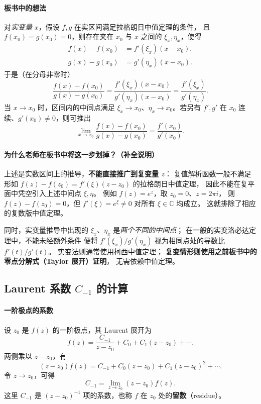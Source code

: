 \paragraph{板书中的想法}
对\emph{实变量} $x$，假设 $f,g$ 在实区间满足拉格朗日中值定理的条件，
且 $f(x_0)=g(x_0)=0$，则存在夹在 $x_0$ 与 $x$ 之间的
$\xi_x,\eta_x$，使得
\begin{align*}
  f(x)-f(x_0)&=f'(\xi_x)(x-x_0),\\
  g(x)-g(x_0)&=g'(\eta_x)(x-x_0).
\end{align*}
于是（在分母非零时）
\[
  \frac{f(x)-f(x_0)}{g(x)-g(x_0)}
  =\frac{f'(\xi_x)(x-x_0)}
         {g'(\eta_x)(x-x_0)}
  =\frac{f'(\xi_x)}{g'(\eta_x)}.
\]
当 $x\to x_0$ 时，区间内的中间点满足
$\xi_x\to x_0$、$\eta_x\to x_0$。若另有
$f',g'$ 在 $x_0$ 连续、$g'(x_0)\ne0$，则可推出
\[
  \lim_{x\to x_0}
    \frac{f(x)-f(x_0)}{g(x)-g(x_0)}
  =\frac{f'(x_0)}{g'(x_0)}.
\]

\paragraph{为什么老师在板书中将这一步划掉？（补全说明）}
上述是实数区间上的推导，\textbf{不能直接推广到复变量 $z$}：
复值解析函数一般不满足形如
$f(z)-f(z_0)=f'(\xi)(z-z_0)$ 的拉格朗日中值定理，
因此不能在复平面中凭空引入上述中间点 $\xi,\eta$。
例如 $f(z)=e^z$，取 $z_0=0$、$z=2\pi i$，
则 $f(z)-f(z_0)=0$，但 $f'(\xi)=e^\xi\ne0$
对所有 $\xi\in\mathbb C$ 均成立。
这就排除了相应的复数版中值定理。

同时，实变量推导中出现的 $\xi_x$、$\eta_x$
是\emph{两个不同的中间点}；
在一般的实变洛必达定理中，不能未经额外条件
便将 $f'(\xi_x)/g'(\eta_x)$
视为相同点处的导数比 $f'(t)/g'(t)$。
实变法则通常使用柯西中值定理；
\textbf{复变情形则使用之前板书中的零点分解式（Taylor 展开）证明}，
无需依赖中值定理。

\subsection*{Laurent 系数 $C_{-1}$ 的计算}

\paragraph{一阶极点的系数}
设 $z_0$ 是 $f(z)$ 的一阶极点，其 Laurent 展开为
\[
  f(z)=\frac{C_{-1}}{z-z_0}
       +C_0+C_1(z-z_0)+\cdots.
\]
两侧乘以 $z-z_0$，有
\[
  (z-z_0)f(z)=C_{-1}+C_0(z-z_0)
     +C_1(z-z_0)^2+\cdots.
\]
令 $z\to z_0$，可得
\[
  \boxed{C_{-1}=\lim_{z\to z_0}(z-z_0)f(z).}
\]
这里 $C_{-1}$ 是 $(z-z_0)^{-1}$ 项的系数，也称
$f$ 在 $z_0$ 处的\textbf{留数}（residue）。

